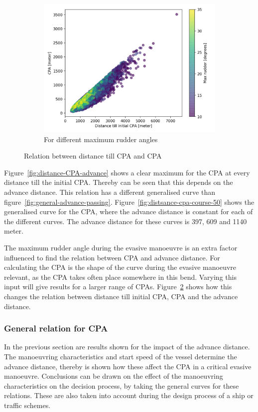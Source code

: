 \begin{figure}[!p]
\begin{subfigure}[b]{0.6\textwidth}
		\includegraphics[width=\linewidth]{figure/distance-cpa-max-rudder}
		\caption{For different maximum rudder angles}
		\label{fig:distance-cpa-max-rudder}
	\end{subfigure}
	\caption{Relation between distance till CPA and CPA}
\end{figure}

Figure~\ref{fig:distance-CPA-advance} shows a clear maximum for the CPA at every distance till the initial CPA. Thereby can be seen that this depends on the advance distance. This relation has a different generalised curve than figure~\ref{fig:general-advance-passing}. Figure~\ref{fig:distsance-cpa-course-50} shows the generalised curve for the CPA, where the advance distance is constant for each of the different curves. The advance distance for these curves is 397, 609 and 1140 meter.

\clearpage

The maximum rudder angle during the evasive manoeuvre is an extra factor influenced to find the relation between CPA and advance distance. For calculating the CPA is the shape of the curve during the evasive manoeuvre relevant, as the CPA takes often place somewhere in this bend. Varying this input will give results for a larger range of CPAs. Figure~\ref{fig:distance-cpa-max-rudder} shows how this changes the relation between distance till initial CPA, CPA and the advance distance.

\subsubsection{General relation for CPA}
In the previous section are results shown for the impact of the advance distance. The manoeuvring characteristics and start speed of the vessel determine the advance distance, thereby is shown how these affect the CPA in a critical evasive manoeuvre. Conclusions can be drawn on the effect of the manoeuvring characteristics on the decision process, by taking the general curves for these relations. These are also taken into account during the design process of a ship or traffic schemes.

